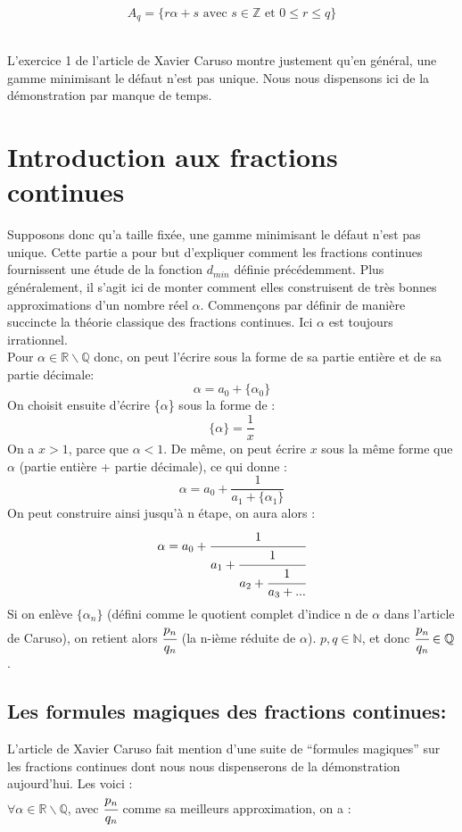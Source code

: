 \documentclass[moyen]{classeUPD}
\begin{document}
\begin{equation}
A_{q}=\{r\alpha+s \text{ avec }s \in\mathbb{Z}\text{ et } 0 \leq r \le q \}
\label{equation 1}
\end{equation}\

L’exercice 1 de l'article \cite{caruso_application_nodate} de Xavier Caruso montre justement qu'en général, une gamme minimisant le défaut n'est pas unique. Nous nous dispensons ici de la démonstration par manque de temps.



\chapter{Introduction aux fractions continues}

Supposons donc qu’a taille fixée, une gamme minimisant le défaut n’est pas unique. Cette partie a pour but d’expliquer comment les fractions continues fournissent une étude de la fonction $d_{min}$ définie précédemment. Plus généralement, il s’agit ici de monter comment elles construisent de très bonnes approximations d’un nombre réel $\alpha$. Commençons par définir de manière succincte la théorie classique des fractions continues. Ici $\alpha$ est toujours irrationnel.\\

Pour $\alpha \in \mathbb{R}\backslash\mathbb{Q}$ donc, on peut l'écrire sous la forme de sa partie entière et de sa partie décimale:
$$\alpha = a_{0}+\{\alpha_{0}\}$$
On choisit ensuite d'écrire \{$\alpha$\} sous la forme de :
$$\{\alpha\} = \frac{1}{x}$$
On a $x>1$, parce que $\alpha < 1$. De même, on peut écrire $x$ sous la même forme que $\alpha$ (partie entière + partie décimale), ce qui donne :
$$\alpha = a_{0}+ \frac{1}{a_{1}+\{\alpha_{1}\}}$$
On peut construire ainsi jusqu'à n étape, on aura alors :
$$\alpha=a_{0}+\cfrac{1}{a_{1}+\cfrac{1}{a_{2}+\cfrac{1}{a_{3}+...}}}$$
Si on enlève $\{\alpha_{n}\}$ (défini comme le quotient complet d'indice n de $\alpha$ dans l'article \cite{caruso_application_nodate} de Caruso), on retient alors $\cfrac{p_{n}}{q_{n}}$ (la n-ième réduite de $\alpha$). $p,q \in \mathbb{N}$, et donc $\cfrac{p_{n}}{q_{n}} \in \mathbb{Q} $ .

\section*{ Les formules magiques des fractions continues:}
L’article \cite{caruso_application_nodate} de Xavier Caruso fait mention d’une suite de “formules magiques” sur les fractions continues dont nous nous dispenserons de la démonstration aujourd’hui. Les voici :\\
$\forall \alpha \in \mathbb{R}\backslash\mathbb{Q}$, avec $\cfrac{p_{n}}{q_{n}}$ comme sa meilleurs approximation, on a :
\end{document}
